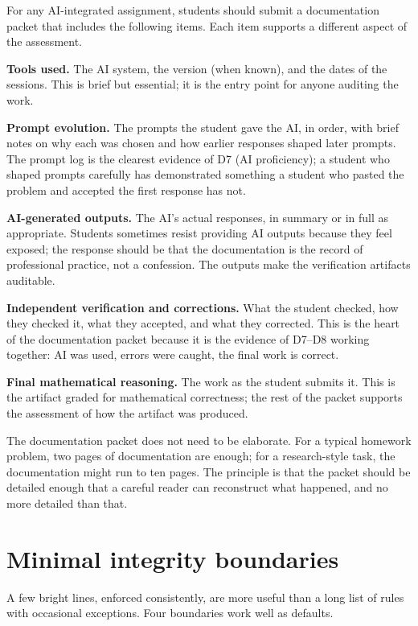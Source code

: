 \documentclass[11pt]{book}
\begin{document}
For any AI-integrated assignment, students should submit a documentation packet that includes the following items. Each item supports a different aspect of the assessment.

\textbf{Tools used.} The AI system, the version (when known), and the dates of the sessions. This is brief but essential; it is the entry point for anyone auditing the work.

\textbf{Prompt evolution.} The prompts the student gave the AI, in order, with brief notes on why each was chosen and how earlier responses shaped later prompts. The prompt log is the clearest evidence of D7 (AI proficiency); a student who shaped prompts carefully has demonstrated something a student who pasted the problem and accepted the first response has not.

\textbf{AI-generated outputs.} The AI's actual responses, in summary or in full as appropriate. Students sometimes resist providing AI outputs because they feel exposed; the response should be that the documentation is the record of professional practice, not a confession. The outputs make the verification artifacts auditable.

\textbf{Independent verification and corrections.} What the student checked, how they checked it, what they accepted, and what they corrected. This is the heart of the documentation packet because it is the evidence of D7--D8 working together: AI was used, errors were caught, the final work is correct.

\textbf{Final mathematical reasoning.} The work as the student submits it. This is the artifact graded for mathematical correctness; the rest of the packet supports the assessment of how the artifact was produced.

The documentation packet does not need to be elaborate. For a typical homework problem, two pages of documentation are enough; for a research-style task, the documentation might run to ten pages. The principle is that the packet should be detailed enough that a careful reader can reconstruct what happened, and no more detailed than that.

\section{Minimal integrity boundaries}

A few bright lines, enforced consistently, are more useful than a long list of rules with occasional exceptions. Four boundaries work well as defaults.
\end{document}
